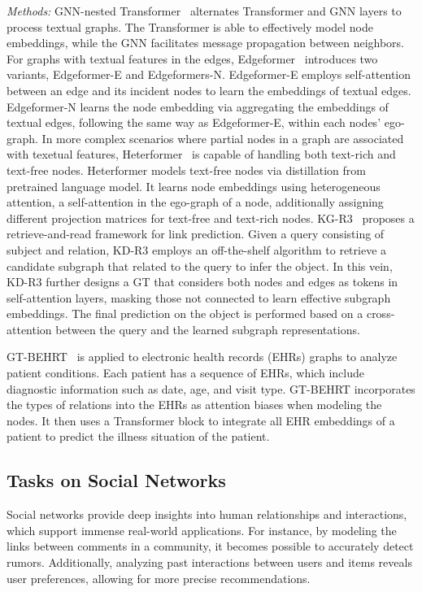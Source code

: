 \textit{Methods:}
GNN-nested Transformer~\cite{yang2021graphformers} alternates Transformer and GNN layers to process textual graphs. The Transformer is able to effectively model node embeddings, while the GNN facilitates message propagation between neighbors. For graphs with textual features in the edges, Edgeformer~\cite{jin2023edgeformers} introduces two variants, Edgeformer-E and Edgeformers-N. Edgeformer-E employs self-attention between an edge and its incident nodes to learn the embeddings of textual edges. Edgeformer-N learns the node embedding via aggregating the embeddings of textual edges, following the same way as Edgeformer-E, within each nodes' ego-graph. In more complex scenarios 
where partial nodes in a graph are associated with texetual features, 
Heterformer~\cite{jin2023heterformer} is capable of handling both text-rich and text-free nodes. Heterformer models text-free nodes via distillation from pretrained language model. It learns node embeddings using heterogeneous attention, a self-attention in the ego-graph of a node, additionally assigning different projection matrices for text-free and text-rich nodes. KG-R3~\cite{retrieval-read} proposes a retrieve-and-read framework for link prediction. Given a query consisting of subject and relation, KD-R3 employs an off-the-shelf algorithm to retrieve a candidate subgraph that related to the query to infer the object. In this vein, 
KD-R3 further designs a GT that considers both nodes and edges as tokens in self-attention layers, masking those not connected to learn effective subgraph embeddings. The final prediction on the object is performed based on a cross-attention between the query and the learned subgraph representations.

GT-BEHRT~\cite{poulain2024graph} is applied to electronic health records (EHRs) graphs to analyze patient conditions. Each patient has a sequence of EHRs, which include diagnostic information such as date, age, and visit type. GT-BEHRT incorporates the types of relations into the EHRs as attention biases when modeling the nodes. It then uses a Transformer block to integrate all EHR embeddings of a patient to predict the illness situation of the patient.

\subsection{Tasks on Social Networks}
\label{sec:application-social}
Social networks provide deep insights into human relationships and interactions, which support immense real-world applications. For instance,  by modeling the links between comments in a community, it becomes possible to accurately detect rumors. Additionally, analyzing past interactions between users and items reveals user preferences, allowing for more precise recommendations.


